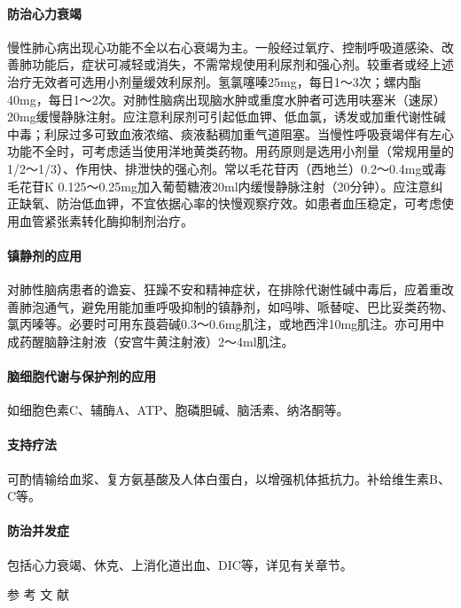 \paragraph{防治心力衰竭}

慢性肺心病出现心功能不全以右心衰竭为主。一般经过氧疗、控制呼吸道感染、改善肺功能后，症状可减轻或消失，不需常规使用利尿剂和强心剂。较重者或经上述治疗无效者可选用小剂量缓效利尿剂。氢氯噻嗪25mg，每日1～3次；螺内酯40mg，每日1～2次。对肺性脑病出现脑水肿或重度水肿者可选用呋塞米（速尿）20mg缓慢静脉注射。应注意利尿剂可引起低血钾、低血氯，诱发或加重代谢性碱中毒；利尿过多可致血液浓缩、痰液黏稠加重气道阻塞。当慢性呼吸衰竭伴有左心功能不全时，可考虑适当使用洋地黄类药物。用药原则是选用小剂量（常规用量的1/2～1/3）、作用快、排泄快的强心剂。常以毛花苷丙（西地兰）0.2～0.4mg或毒毛花苷K
0.125～0.25mg加入葡萄糖液20ml内缓慢静脉注射（20分钟）。应注意纠正缺氧、防治低血钾，不宜依据心率的快慢观察疗效。如患者血压稳定，可考虑使用血管紧张素转化酶抑制剂治疗。

\paragraph{镇静剂的应用}

对肺性脑病患者的谵妄、狂躁不安和精神症状，在排除代谢性碱中毒后，应着重改善肺泡通气，避免用能加重呼吸抑制的镇静剂，如吗啡、哌替啶、巴比妥类药物、氯丙嗪等。必要时可用东莨菪碱0.3～0.6mg肌注，或地西泮10mg肌注。亦可用中成药醒脑静注射液（安宫牛黄注射液）2～4ml肌注。

\paragraph{脑细胞代谢与保护剂的应用}

如细胞色素C、辅酶A、ATP、胞磷胆碱、脑活素、纳洛酮等。

\paragraph{支持疗法}

可酌情输给血浆、复方氨基酸及人体白蛋白，以增强机体抵抗力。补给维生素B、C等。

\paragraph{防治并发症}

包括心力衰竭、休克、上消化道出血、DIC等，详见有关章节。
\protect\hypertarget{text00100.html}{}{}

\hypertarget{text00100.htmlux5cux23CHP4-2-4}{}
参 考 文 献


